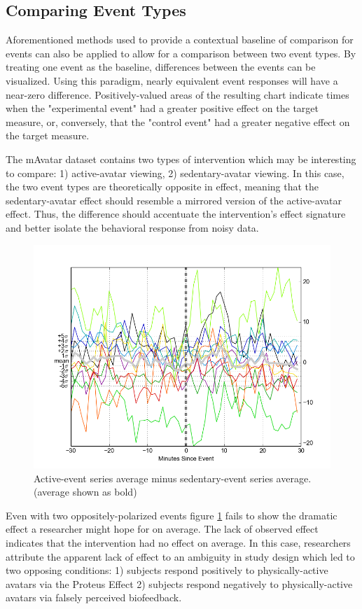 \subsection{Comparing Event Types}
Aforementioned methods used to provide a contextual baseline of comparison for events can also be applied to allow for a comparison between two event types.
By treating one event as the baseline, differences between the events can be visualized.
Using this paradigm, nearly equivalent event responses will have a near-zero difference.
Positively-valued areas of the resulting chart indicate times when the "experimental event" had a greater positive effect on the target measure, or, conversely, that the "control event" had a greater negative effect on the target measure.


The mAvatar dataset contains two types of intervention which may be interesting to compare: 1) active-avatar viewing, 2) sedentary-avatar viewing.
In this case, the two event types are theoretically opposite in effect, meaning that the sedentary-avatar effect should resemble a mirrored version of the active-avatar effect.
Thus, the difference should accentuate the intervention's effect signature and better isolate the behavioral response from noisy data.

\begin{figure}
\centering
\includegraphics[width=0.9\columnwidth]{./img/mAvatar_difference_events.png}
\caption{Active-event series average minus sedentary-event series average. (average shown as bold)}
\label{fig:mAvatarDifference}
\end{figure}

Even with two oppositely-polarized events figure \ref{fig:mAvatarDifference} fails to show the dramatic effect a researcher might hope for on average.
The lack of observed effect indicates that the intervention had no effect on average.
In this case, researchers attribute the apparent lack of effect to an ambiguity in study design which led to two opposing conditions: 1) subjects respond positively to physically-active avatars via the Proteus Effect \cite{yee2009proteus} 2) subjects respond negatively to physically-active avatars via falsely perceived biofeedback.

